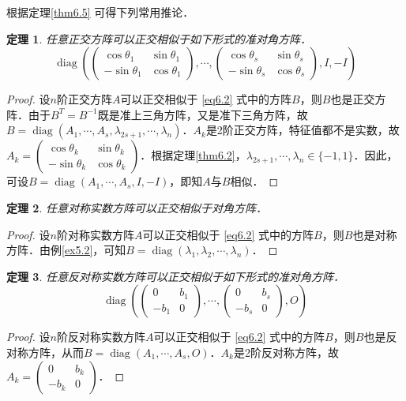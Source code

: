 \documentclass[a4paper,fontset=windows]{ctexbook}
\newtheorem{theorem}{定理}[chapter]
\theoremstyle{definition}
\DeclareMathOperator{\diag}{diag}
\begin{document}
\medskip 根据定理\ref{thm6.5} 可得下列常用推论．

\begin{theorem}
任意正交方阵可以正交相似于如下形式的准对角方阵．
$$\diag\left(\begin{pmatrix}\cos\theta_1&\sin\theta_1 \\ -\sin\theta_1&\cos\theta_1\end{pmatrix},\cdots,\begin{pmatrix}\cos\theta_s&\sin\theta_s \\ -\sin\theta_s&\cos\theta_s\end{pmatrix},I,-I\right)$$
\end{theorem}

\begin{proof}
设$n$阶正交方阵$A$可以正交相似于 \eqref{eq6.2} 式中的方阵$B$，则$B$也是正交方阵．由于$B^T=B^{-1}$既是准上三角方阵，又是准下三角方阵，故$B=\diag(A_1,\cdots,A_s,\lambda_{2s+1},\cdots,\lambda_n)$．$A_k$是2阶正交方阵，特征值都不是实数，故$A_k=\begin{pmatrix}\cos\theta_k&\sin\theta_k \\ -\sin\theta_k&\cos\theta_k\end{pmatrix}$．根据定理\ref{thm6.2}，$\lambda_{2s+1},\cdots,\lambda_n\in\{-1,1\}$．因此，可设$B=\diag(A_1,\cdots,A_s,I,-I)$，即知$A$与$B$相似．
\end{proof}

\begin{theorem}\label{thm6.7}
任意对称实数方阵可以正交相似于对角方阵．
\end{theorem}

\begin{proof}
设$n$阶对称实数方阵$A$可以正交相似于 \eqref{eq6.2} 式中的方阵$B$，则$B$也是对称方阵．由例\ref{ex5.2}，可知$B=\diag(\lambda_1,\lambda_2,\cdots,\lambda_n)$．
\end{proof}

\begin{theorem}
任意反对称实数方阵可以正交相似于如下形式的准对角方阵．
$$\diag\left(\begin{pmatrix}0&b_1 \\ -b_1&0\end{pmatrix},\cdots,\begin{pmatrix}0&b_s \\ -b_s&0\end{pmatrix},O\right)$$
\end{theorem}

\begin{proof}
设$n$阶反对称实数方阵$A$可以正交相似于 \eqref{eq6.2} 式中的方阵$B$，则$B$也是反对称方阵，从而$B=\diag(A_1,\cdots,A_s,O)$．$A_k$是2阶反对称方阵，故$A_k=\begin{pmatrix}0&b_k \\ -b_k&0\end{pmatrix}$．
\end{proof}
\end{document}
